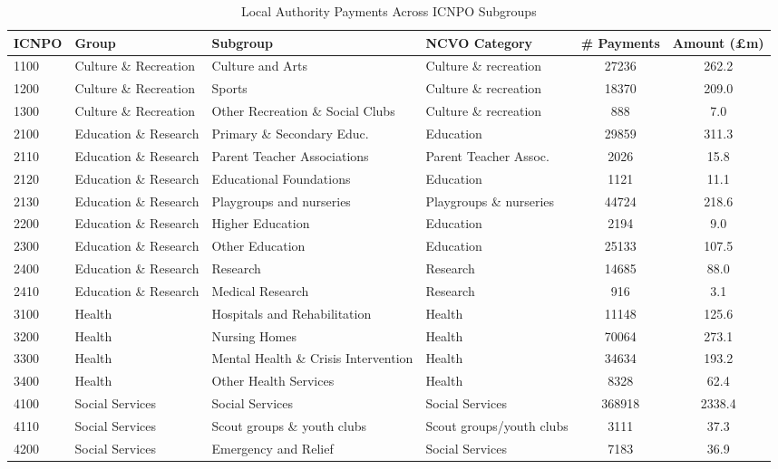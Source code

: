 \documentclass[12pt]{article}
\begin{document}
\begin{table}[!t]
\centering
\caption{Local Authority Payments Across ICNPO Subgroups}
\label{subgrouptable}
\scriptsize
\begin{tabular}{llllcc}\toprule
ICNPO & Group & Subgroup & NCVO Category  &\# Payments & Amount (£m) \\ \midrule
1100  & Culture \& Recreation & Culture and Arts & Culture \& recreation & 27236 & 262.2 \\
1200  & Culture \& Recreation & Sports & Culture \& recreation & 18370 & 209.0 \\
1300  & Culture \& Recreation  & Other Recreation \& Social Clubs & Culture \& recreation  & 888 & 7.0 \\
2100  & Education \& Research & Primary \& Secondary Educ. & Education & 29859 & 311.3 \\
2110  & Education \& Research & Parent Teacher Associations & Parent Teacher Assoc.  & 2026 & 15.8 \\
2120  & Education \& Research & Educational Foundations  & Education  & 1121 & 11.1 \\
2130  & Education \& Research & Playgroups and nurseries & Playgroups \& nurseries   & 44724  & 218.6   \\
2200  & Education \& Research & Higher Education  & Education  & 2194 & 9.0  \\
2300  & Education \& Research & Other Education & Education  & 25133  & 107.5   \\
2400  & Education \& Research & Research   & Research   & 14685  & 88.0 \\
2410  & Education \& Research & Medical Research  & Research   & 916  & 3.1  \\
3100  & Health & Hospitals and Rehabilitation & Health   & 11148  & 125.6   \\
3200  & Health & Nursing Homes   & Health   & 70064  & 273.1   \\
3300  & Health & Mental Health \& Crisis Intervention  & Health   & 34634  & 193.2   \\
3400  & Health & Other Health Services  & Health   & 8328 & 62.4 \\
4100  & Social Services & Social Services & Social Services  & 368918 & 2338.4  \\
4110  & Social Services & Scout groups \& youth clubs & Scout groups/youth clubs & 3111 & 37.3 \\
4200  & Social Services & Emergency and Relief   & Social Services  & 7183 & 36.9 \\

\end{tabular}
\end{table}
\end{document}
